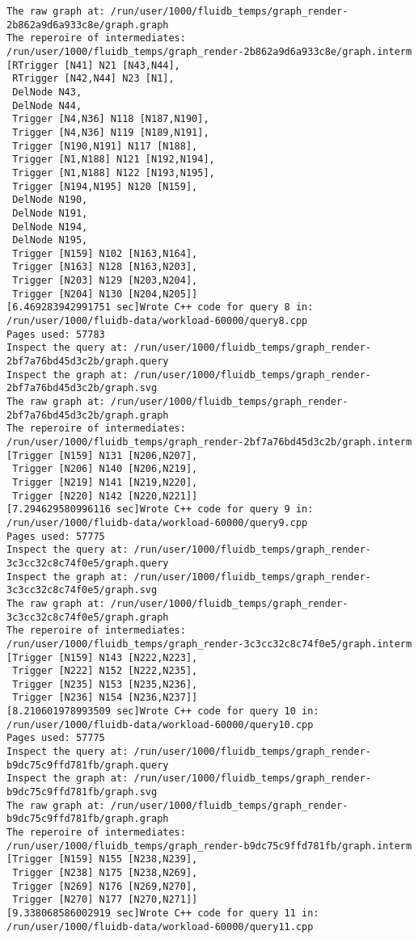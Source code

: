 \begin{code}
\begin{verbatim}
The raw graph at: /run/user/1000/fluidb_temps/graph_render-2b862a9d6a933c8e/graph.graph
The reperoire of intermediates: /run/user/1000/fluidb_temps/graph_render-2b862a9d6a933c8e/graph.interm
[RTrigger [N41] N21 [N43,N44],
 RTrigger [N42,N44] N23 [N1],
 DelNode N43,
 DelNode N44,
 Trigger [N4,N36] N118 [N187,N190],
 Trigger [N4,N36] N119 [N189,N191],
 Trigger [N190,N191] N117 [N188],
 Trigger [N1,N188] N121 [N192,N194],
 Trigger [N1,N188] N122 [N193,N195],
 Trigger [N194,N195] N120 [N159],
 DelNode N190,
 DelNode N191,
 DelNode N194,
 DelNode N195,
 Trigger [N159] N102 [N163,N164],
 Trigger [N163] N128 [N163,N203],
 Trigger [N203] N129 [N203,N204],
 Trigger [N204] N130 [N204,N205]]
[6.469283942991751 sec]Wrote C++ code for query 8 in: /run/user/1000/fluidb-data/workload-60000/query8.cpp
Pages used: 57783
Inspect the query at: /run/user/1000/fluidb_temps/graph_render-2bf7a76bd45d3c2b/graph.query
Inspect the graph at: /run/user/1000/fluidb_temps/graph_render-2bf7a76bd45d3c2b/graph.svg
The raw graph at: /run/user/1000/fluidb_temps/graph_render-2bf7a76bd45d3c2b/graph.graph
The reperoire of intermediates: /run/user/1000/fluidb_temps/graph_render-2bf7a76bd45d3c2b/graph.interm
[Trigger [N159] N131 [N206,N207],
 Trigger [N206] N140 [N206,N219],
 Trigger [N219] N141 [N219,N220],
 Trigger [N220] N142 [N220,N221]]
[7.294629580996116 sec]Wrote C++ code for query 9 in: /run/user/1000/fluidb-data/workload-60000/query9.cpp
Pages used: 57775
Inspect the query at: /run/user/1000/fluidb_temps/graph_render-3c3cc32c8c74f0e5/graph.query
Inspect the graph at: /run/user/1000/fluidb_temps/graph_render-3c3cc32c8c74f0e5/graph.svg
The raw graph at: /run/user/1000/fluidb_temps/graph_render-3c3cc32c8c74f0e5/graph.graph
The reperoire of intermediates: /run/user/1000/fluidb_temps/graph_render-3c3cc32c8c74f0e5/graph.interm
[Trigger [N159] N143 [N222,N223],
 Trigger [N222] N152 [N222,N235],
 Trigger [N235] N153 [N235,N236],
 Trigger [N236] N154 [N236,N237]]
[8.210601978993509 sec]Wrote C++ code for query 10 in: /run/user/1000/fluidb-data/workload-60000/query10.cpp
Pages used: 57775
Inspect the query at: /run/user/1000/fluidb_temps/graph_render-b9dc75c9ffd781fb/graph.query
Inspect the graph at: /run/user/1000/fluidb_temps/graph_render-b9dc75c9ffd781fb/graph.svg
The raw graph at: /run/user/1000/fluidb_temps/graph_render-b9dc75c9ffd781fb/graph.graph
The reperoire of intermediates: /run/user/1000/fluidb_temps/graph_render-b9dc75c9ffd781fb/graph.interm
[Trigger [N159] N155 [N238,N239],
 Trigger [N238] N175 [N238,N269],
 Trigger [N269] N176 [N269,N270],
 Trigger [N270] N177 [N270,N271]]
[9.338068586002919 sec]Wrote C++ code for query 11 in: /run/user/1000/fluidb-data/workload-60000/query11.cpp

\end{verbatim}
\end{code}
